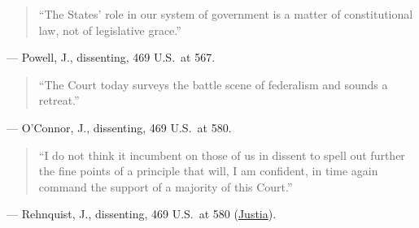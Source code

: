 \documentclass[12pt]{article}
\begin{document}
\begin{quote}
``The States' role in our system of government is a matter of constitutional law, not of legislative grace.''
\end{quote}
\noindent --- Powell, J., dissenting, 469 U.S.\ at 567.

\begin{quote}
``The Court today surveys the battle scene of federalism and sounds a retreat.''
\end{quote}
\noindent --- O'Connor, J., dissenting, 469 U.S.\ at 580.

\begin{quote}
``I do not think it incumbent on those of us in dissent to spell out further the fine points of a principle that will, I am confident, in time again command the support of a majority of this Court.''
\end{quote}
\noindent --- Rehnquist, J., dissenting, 469 U.S.\ at 580 (\href{https://supreme.justia.com/cases/federal/us/469/528/}{Justia}).
\end{document}
